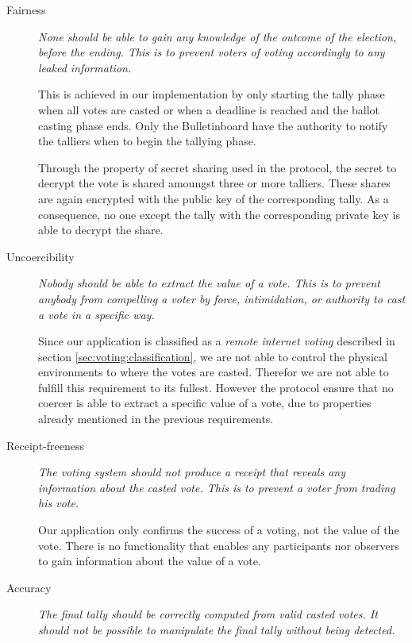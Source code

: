 \begin{description}
    \item[Fairness]
        \textit{None should be able to gain any knowledge of the outcome of the election, before the ending. This is to prevent voters of voting accordingly to any leaked information.}       
    
        This is achieved in our implementation by only starting the tally phase when all votes are casted or when a deadline is 
        reached and the ballot casting phase ends. Only the Bulletinboard have the authority to notify the talliers when to begin the tallying phase.  
        
        Through the property of secret sharing used in the protocol, the secret to decrypt the
        vote is shared amoungst three or more talliers. These shares are again encrypted with the public key 
        of the corresponding tally. As a consequence, no one except the tally with the corresponding
        private key is able to decrypt the share.
  
           
    \item[Uncoercibility] 
        \textit{Nobody should be able to extract the value of a vote. This is to prevent anybody from compelling a voter by force, intimidation, or authority to cast a vote in a specific way.}
    
        Since our application is classified as a \textit{remote internet voting} described in section \ref{sec:voting:classification}, we are not able to control the physical environments to where the votes are casted. Therefor we are not able to fulfill this requirement to its fullest. However the protocol ensure that no coercer is able to extract a specific value of a vote, due to properties already mentioned in the previous requirements.         
        
    \item[Receipt-freeness] 
        \textit{The voting system should not produce a receipt that reveals any information about the casted vote. This is to prevent a voter from trading his vote.}
            
        Our application only confirms the success of a voting, not the value of the vote. There is no functionality that enables any  participants nor observers to gain information about the value of a vote.         
        
    \item[Accuracy]
        \textit{The final tally should be correctly computed from valid casted votes. It should not be possible to manipulate the final tally without being detected.}
        

\end{description}
